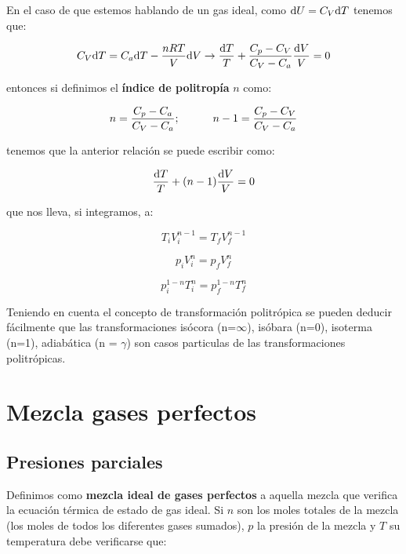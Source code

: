\documentclass[12pt,a4paper,oneside]{book}
\begin{document}
En el caso de que estemos hablando de un gas ideal, como $\mathrm{d} U = C_V \mathrm{d} T$ tenemos que:

$$ C_V \mathrm{d} T = C_a \mathrm{d} T - \dfrac{nRT}{V} \mathrm{d} V \rightarrow  \dfrac{\mathrm{d} T }{T} + \dfrac{C_p - C_V}{C_V - C_a} \dfrac{\mathrm{d} V}{V} = 0 $$


entonces si definimos el \textbf{índice de politropía} $n$ como:

\begin{equation}
n = \dfrac{C_p - C_a}{C_V - C_a} ; \quad \quad \quad n -1 = \dfrac{C_p - C_V}{C_V - C_a}
\end{equation}


tenemos que la anterior relación se puede escribir como:

\begin{equation}
\dfrac{\mathrm{d} T}{T} + (n-1) \dfrac{\mathrm{d} V}{V} = 0
\end{equation}

que nos lleva, si integramos, a:



\begin{equation}
T_i V_i^{n-1} = T_f V_f^{n-1} 
\end{equation}


\begin{equation}
p_i V_i^{n} = p_f V_f^{n}
\end{equation}


\begin{equation}
p_i^{1-n} T_i^{n} = p_f^{1-n} T_f^{n} 
\end{equation}

Teniendo en cuenta el concepto de transformación politrópica se pueden deducir fácilmente que las transformaciones isócora (n=$\infty$), isóbara (n=0), isoterma (n=1), adiabática (n = $\gamma$) son casos particulas de las transformaciones politrópicas.


\section{Mezcla gases perfectos}

\subsection{Presiones parciales}

Definimos como \textbf{mezcla ideal de gases perfectos} a aquella mezcla que verifica la ecuación térmica de estado de gas ideal. Si $n$ son los moles totales de la mezcla (los moles de todos los diferentes gases sumados), $p$ la presión de la mezcla y $T$ su temperatura debe verificarse que:
\end{document}
